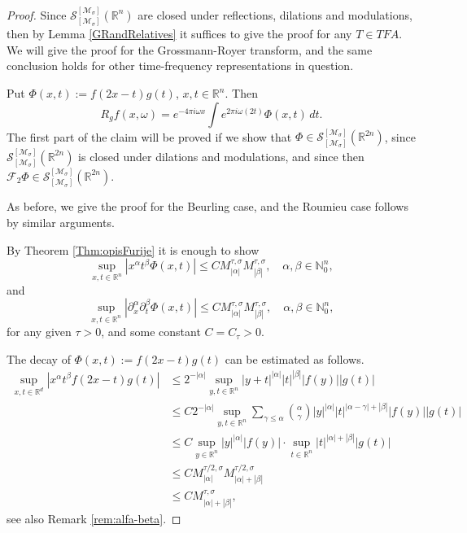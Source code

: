 \documentclass[10pt,a4paper]{amsart}
\begin{document}
\begin{proof}
Since $\mathcal S_{[\mathcal{M}_\sigma ]}^{[\mathcal{M}_\sigma]} (\mathbb R^{n})$
are closed under reflections, dilations and modulations, then by Lemma \ref{GRandRelatives}
it suffices to give the proof for any $T \in TFA$.
We will give the proof for the Grossmann-Royer transform, and the same conclusion holds for other time-frequency representations in question. 

\par

Put $ \Phi (x,t) := f(2x -t) g (t)$, $x,t \in \mathbb R^{n}$.
Then 
$$
R_g f (x,\omega) = e^{-4\pi i \omega x}  \int e^{2\pi i \omega (2t) } \Phi (x,t)\, dt. 
$$
The first part of the claim will be proved 
if we show that
$ \Phi \in \mathcal S_{[\mathcal{M}_\sigma ]}^{[\mathcal{M}_\sigma]} (\mathbb R^{2n}) $,
since $  \mathcal S_{[\mathcal{M}_\sigma ]}^{[\mathcal{M}_\sigma]} (\mathbb R^{2n})$ is closed under dilations and modulations,
and since then $\mathcal F_2 \Phi \in 
  \mathcal S_{[\mathcal{M}_\sigma ]}^{[\mathcal{M}_\sigma]} (\mathbb R^{2n})$.
  
As before, we give the proof for the Beurling case, and the 
Roumieu case follows by similar arguments.

By Theorem \ref{Thm:opisFurije} it is enough to show
\begin{equation} \label{varphi po x}
\sup_{x,t \in \mathbb{R}^n}  
| x^{\alpha}  t^\beta  \Phi (x,t) | \leq C 
M^{\tau, \sigma} _{|\alpha|} M^{\tau, \sigma} _{|\beta|},\quad \alpha,\beta\in\mathbb N_0^n,
\end{equation}
and
\begin{equation} \label{varphi po ksi}
\sup_{x,t \in \mathbb{R}^n}  
|  \partial^\alpha _x \partial^\beta _t  \Phi (x,t) |
\leq C M^{\tau, \sigma} _{|\alpha|} M^{\tau, \sigma} _{|\beta|},\quad \alpha,\beta\in\mathbb N_0^n,
\end{equation}
for any given $\tau > 0$, and some constant $C= C_\tau >0$.

The decay of  $ \Phi (x,t) := f(2x -t) g (t)$ can be estimated as follows.
\begin{align}
\sup_{x,t \in \mathbb{R}^d}  | x^{\alpha}  t^\beta  f(2x-t) g (t) |
& \leq  
2^{-|\alpha|}\sup_{y,t \in \mathbb{R}^n}  |y+t|^{|\alpha|}  |t|^{|\beta|} 
|f(y) | |  g (t) | 
\nonumber \\
&\leq C 
2^{-|\alpha|}\sup_{y,t \in \mathbb{R}^n }
\sum_{\gamma \leq \alpha} \binom{\alpha}{\gamma}
|y|^{|\alpha|}  |t|^{|\alpha - \gamma| + |\beta|} 
|f(y) | |  g (t) | 
\nonumber \\
&\leq C  
\sup_{y \in \mathbb{R}^n} |y|^{|\alpha|}  |f(y) | \cdot
\sup_{t \in \mathbb{R}^n} |t|^{|\alpha| + |\beta|} 
 |  g (t) | 
\nonumber \\
& \leq
C  M^{\tau/2,\sigma}_{|\alpha |}  
M^{\tau/2,\sigma}_{|\alpha | +|\beta|} 
\nonumber \\
& \leq
C  M^{\tau,\sigma}_{|\alpha | + |\beta|}, 
\label{eq:est-mult}
\end{align}
see also Remark \ref{rem:alfa-beta}.


\end{proof}
\end{document}
